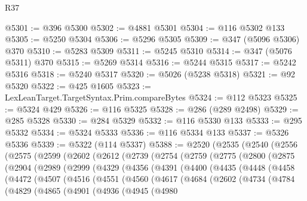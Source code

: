 \begin{lexlean}{R37}
\begin{coremodule}
@5301 := @396 @5300
@5302 := @4881 @5301
@5304 := @116 @5302 @133
@5305 := @5250 @5304
@5306 := @5296 @5305
@5309 := @347 (@5096 @5306) @370
@5310 := @5283 @5309
@5311 := @5245 @5310
@5314 := @347 (@5076 @5311) @370
@5315 := @5269 @5314
@5316 := @5244 @5315
@5317 := @5242 @5316
@5318 := @5240 @5317
@5320 := @5026 (@5238 @5318)
@5321 := @92 @5320
@5322 := @425 @1605
@5323 := LexLeanTarget.TargetSyntax.Prim.compareBytes
@5324 := @112 @5323
@5325 := @5324 @429
@5326 := @116 @5325
@5328 := @286 (@289 @2498)
@5329 := @285 @5328
@5330 := @284 @5329
@5332 := @116 @5330 @133
@5333 := @295 @5332
@5334 := @5324 @5333
@5336 := @116 @5334 @133
@5337 := @5326 @5336
@5339 := @5322 (@114 @5337)
@5388 := @2520
    (@2535
      (@2540
        (@2556
          (@2575
            (@2599
              (@2602
                (@2612
                  (@2739
                    (@2754
                      (@2759
                        (@2775
                          (@2800
                            (@2875
                              (@2904
                                (@2989
                                  (@2999
                                    (@4329
                                      (@4356
                                        (@4391
                                          (@4400
                                            (@4435
                                              (@4448
                                                (@4458
                                                  (@4472
                                                    (@4507
                                                      (@4516
                                                        (@4551
                                                          (@4560
                                                            (@4617
                                                              (@4684
                                                                (@2602
                                                                  (@4734
                                                                    (@4784
                                                                      (@4829
                                                                        (@4865
                                                                          (@4901
                                                                            (@4936
                                                                              (@4945
                                                                                (@4980

\end{coremodule}
\end{lexlean}
